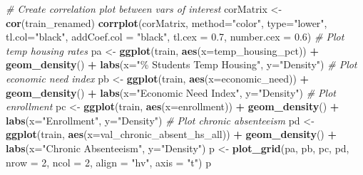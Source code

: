 \documentclass[
  man,floatsintext]{apa6}
\newenvironment{Shaded}{\begin{snugshade}}{\end{snugshade}}
\newcommand{\AttributeTok}[1]{\textcolor[rgb]{0.13,0.29,0.53}{#1}}
\newcommand{\CommentTok}[1]{\textcolor[rgb]{0.56,0.35,0.01}{\textit{#1}}}
\newcommand{\DecValTok}[1]{\textcolor[rgb]{0.00,0.00,0.81}{#1}}
\newcommand{\FloatTok}[1]{\textcolor[rgb]{0.00,0.00,0.81}{#1}}
\newcommand{\FunctionTok}[1]{\textcolor[rgb]{0.13,0.29,0.53}{\textbf{#1}}}
\newcommand{\NormalTok}[1]{#1}
\newcommand{\OtherTok}[1]{\textcolor[rgb]{0.56,0.35,0.01}{#1}}
\newcommand{\SpecialCharTok}[1]{\textcolor[rgb]{0.81,0.36,0.00}{\textbf{#1}}}
\newcommand{\StringTok}[1]{\textcolor[rgb]{0.31,0.60,0.02}{#1}}
\begin{document}
\begin{Shaded}
\begin{Highlighting}[]
\CommentTok{\# Create correlation plot between vars of interest}
\NormalTok{corMatrix }\OtherTok{\textless{}{-}} \FunctionTok{cor}\NormalTok{(train\_renamed)}
\FunctionTok{corrplot}\NormalTok{(corMatrix, }\AttributeTok{method=}\StringTok{"color"}\NormalTok{, }\AttributeTok{type=}\StringTok{"lower"}\NormalTok{, }\AttributeTok{tl.col=}\StringTok{"black"}\NormalTok{, }\AttributeTok{addCoef.col =} \StringTok{"black"}\NormalTok{, }\AttributeTok{tl.cex =} \FloatTok{0.7}\NormalTok{, }\AttributeTok{number.cex =} \FloatTok{0.6}\NormalTok{)}
\CommentTok{\# Plot temp housing rates}
\NormalTok{pa }\OtherTok{\textless{}{-}} \FunctionTok{ggplot}\NormalTok{(train, }\FunctionTok{aes}\NormalTok{(}\AttributeTok{x=}\NormalTok{temp\_housing\_pct)) }\SpecialCharTok{+}
    \FunctionTok{geom\_density}\NormalTok{() }\SpecialCharTok{+}
    \FunctionTok{labs}\NormalTok{(}\AttributeTok{x=}\StringTok{"\% Students Temp Housing"}\NormalTok{, }\AttributeTok{y=}\StringTok{"Density"}\NormalTok{)}
\CommentTok{\# Plot economic need index}
\NormalTok{pb }\OtherTok{\textless{}{-}} \FunctionTok{ggplot}\NormalTok{(train, }\FunctionTok{aes}\NormalTok{(}\AttributeTok{x=}\NormalTok{economic\_need)) }\SpecialCharTok{+}
    \FunctionTok{geom\_density}\NormalTok{() }\SpecialCharTok{+}
    \FunctionTok{labs}\NormalTok{(}\AttributeTok{x=}\StringTok{"Economic Need Index"}\NormalTok{, }\AttributeTok{y=}\StringTok{"Density"}\NormalTok{)}
\CommentTok{\# Plot enrollment}
\NormalTok{pc }\OtherTok{\textless{}{-}} \FunctionTok{ggplot}\NormalTok{(train, }\FunctionTok{aes}\NormalTok{(}\AttributeTok{x=}\NormalTok{enrollment)) }\SpecialCharTok{+}
    \FunctionTok{geom\_density}\NormalTok{() }\SpecialCharTok{+}
    \FunctionTok{labs}\NormalTok{(}\AttributeTok{x=}\StringTok{"Enrollment"}\NormalTok{, }\AttributeTok{y=}\StringTok{"Density"}\NormalTok{)}
\CommentTok{\# Plot chronic absenteeism}
\NormalTok{pd }\OtherTok{\textless{}{-}} \FunctionTok{ggplot}\NormalTok{(train, }\FunctionTok{aes}\NormalTok{(}\AttributeTok{x=}\NormalTok{val\_chronic\_absent\_hs\_all)) }\SpecialCharTok{+}
    \FunctionTok{geom\_density}\NormalTok{() }\SpecialCharTok{+}
    \FunctionTok{labs}\NormalTok{(}\AttributeTok{x=}\StringTok{"Chronic Absenteeism"}\NormalTok{, }\AttributeTok{y=}\StringTok{"Density"}\NormalTok{)}
\NormalTok{p }\OtherTok{\textless{}{-}} \FunctionTok{plot\_grid}\NormalTok{(pa, pb, pc, pd, }\AttributeTok{nrow =} \DecValTok{2}\NormalTok{, }\AttributeTok{ncol =} \DecValTok{2}\NormalTok{, }\AttributeTok{align =} \StringTok{"hv"}\NormalTok{, }\AttributeTok{axis =} \StringTok{"t"}\NormalTok{)}
\NormalTok{p}


\end{Highlighting}
\end{Shaded}
\end{document}
